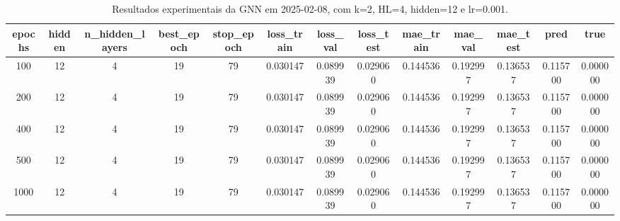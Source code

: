 \begin{table}[h]
\centering
\caption{Resultados experimentais da GNN em 2025-02-08, com k=2, HL=4, hidden=12 e lr=0.001.}
\label{tab:gnn_results_k2_hl4_h12_d20250208}
\begin{tabular}{ccccccccccccc}
\toprule
epochs & hidden & n\_hidden\_layers & best\_epoch & stop\_epoch & loss\_train & loss\_val & loss\_test & mae\_train & mae\_val & mae\_test & pred & true \\
\midrule
100 & 12 & 4 & 19 & 79 & 0.030147 & 0.089939 & 0.029060 & 0.144536 & 0.192997 & 0.136537 & 0.115700 & 0.000000 \\
200 & 12 & 4 & 19 & 79 & 0.030147 & 0.089939 & 0.029060 & 0.144536 & 0.192997 & 0.136537 & 0.115700 & 0.000000 \\
400 & 12 & 4 & 19 & 79 & 0.030147 & 0.089939 & 0.029060 & 0.144536 & 0.192997 & 0.136537 & 0.115700 & 0.000000 \\
500 & 12 & 4 & 19 & 79 & 0.030147 & 0.089939 & 0.029060 & 0.144536 & 0.192997 & 0.136537 & 0.115700 & 0.000000 \\
1000 & 12 & 4 & 19 & 79 & 0.030147 & 0.089939 & 0.029060 & 0.144536 & 0.192997 & 0.136537 & 0.115700 & 0.000000 \\
\bottomrule
\end{tabular}
\end{table}
